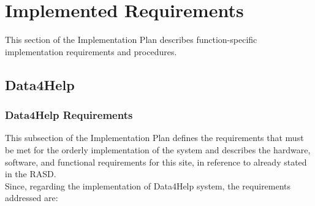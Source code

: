 \documentclass[a4paper, hidelinks, 12pt]{report}
\begin{document}
	\chapter{Implemented Requirements}	
This section of the Implementation Plan describes function-specific implementation requirements and procedures.

\section{\textbf{Data4Help}}
\subsection{Data4Help Requirements}
This subsection of the Implementation Plan defines the requirements that must be met for the orderly implementation of the system and describes the hardware, software, and functional requirements for this site, in reference to already stated in the RASD.\\
Since, regarding the implementation of Data4Help system, the requirements addressed are:
\end{document}
